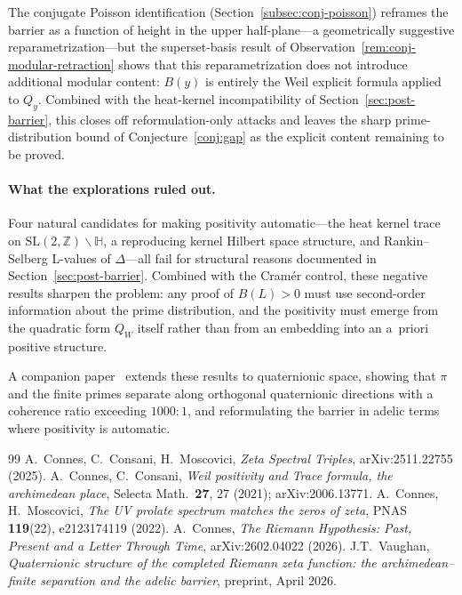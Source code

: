 \documentclass[11pt,a4paper]{article}
\begin{document}
The conjugate Poisson identification (Section~\ref{subsec:conj-poisson}) reframes the barrier as a function of height in the upper half-plane---a geometrically suggestive reparametrization---but the superset-basis result of Observation~\ref{rem:conj-modular-retraction} shows that this reparametrization does not introduce additional modular content: $B(y)$ is entirely the Weil explicit formula applied to $Q_y$. Combined with the heat-kernel incompatibility of Section~\ref{sec:post-barrier}, this closes off reformulation-only attacks and leaves the sharp prime-distribution bound of Conjecture~\ref{conj:gap} as the explicit content remaining to be proved.

\paragraph{What the explorations ruled out.} Four natural candidates for making positivity automatic---the heat kernel trace on $\mathrm{SL}(2,\mathbb{Z}) \backslash \mathbb{H}$, a reproducing kernel Hilbert space structure, and Rankin--Selberg L-values of $\Delta$---all fail for structural reasons documented in Section~\ref{sec:post-barrier}. Combined with the Cram\'er control, these negative results sharpen the problem: any proof of $B(L) > 0$ must use second-order information about the prime distribution, and the positivity must emerge from the quadratic form $Q_W$ itself rather than from an embedding into an a~priori positive structure.

\medskip
\noindent A companion paper~\cite{VaughanQuat} extends these results to quaternionic space, showing that $\pi$ and the finite primes separate along orthogonal quaternionic directions with a coherence ratio exceeding $1000{:}1$, and reformulating the barrier in adelic terms where positivity is automatic.


\begin{thebibliography}{99}
 A.~Connes, C.~Consani, H.~Moscovici, \emph{Zeta Spectral Triples}, arXiv:2511.22755 (2025).
 A.~Connes, C.~Consani, \emph{Weil positivity and Trace formula, the archimedean place}, Selecta Math.\ \textbf{27}, 27 (2021); arXiv:2006.13771.
 A.~Connes, H.~Moscovici, \emph{The UV prolate spectrum matches the zeros of zeta}, PNAS \textbf{119}(22), e2123174119 (2022).
 A.~Connes, \emph{The Riemann Hypothesis: Past, Present and a Letter Through Time}, arXiv:2602.04022 (2026).
 J.T.~Vaughan, \emph{Quaternionic structure of the completed Riemann zeta function: the archimedean--finite separation and the adelic barrier}, preprint, April 2026.
\end{thebibliography}
\end{document}
